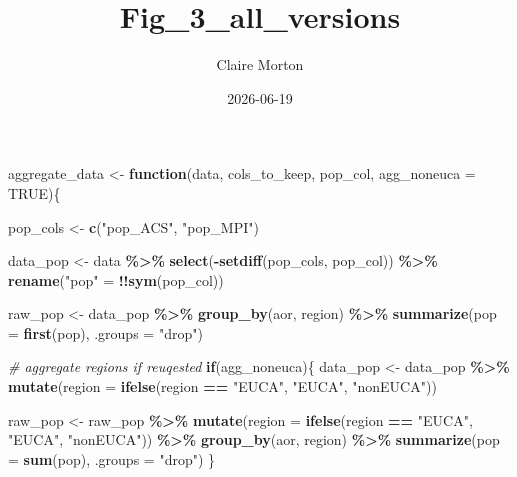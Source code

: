 \documentclass[
]{article}
\title{Fig\_3\_all\_versions}
\author{Claire Morton}
\date{2026-06-19}
\newenvironment{Shaded}{\begin{snugshade}}{\end{snugshade}}
\newcommand{\AttributeTok}[1]{\textcolor[rgb]{0.13,0.29,0.53}{#1}}
\newcommand{\CommentTok}[1]{\textcolor[rgb]{0.56,0.35,0.01}{\textit{#1}}}
\newcommand{\ConstantTok}[1]{\textcolor[rgb]{0.56,0.35,0.01}{#1}}
\newcommand{\ControlFlowTok}[1]{\textcolor[rgb]{0.13,0.29,0.53}{\textbf{#1}}}
\newcommand{\FunctionTok}[1]{\textcolor[rgb]{0.13,0.29,0.53}{\textbf{#1}}}
\newcommand{\NormalTok}[1]{#1}
\newcommand{\OtherTok}[1]{\textcolor[rgb]{0.56,0.35,0.01}{#1}}
\newcommand{\SpecialCharTok}[1]{\textcolor[rgb]{0.81,0.36,0.00}{\textbf{#1}}}
\newcommand{\StringTok}[1]{\textcolor[rgb]{0.31,0.60,0.02}{#1}}
\begin{document}
\maketitle

\begin{Shaded}
\begin{Highlighting}[]
\NormalTok{aggregate\_data }\OtherTok{\textless{}{-}} \ControlFlowTok{function}\NormalTok{(data, }
\NormalTok{                           cols\_to\_keep, }
\NormalTok{                           pop\_col,}
                           \AttributeTok{agg\_noneuca =} \ConstantTok{TRUE}\NormalTok{)\{}
  
  
\NormalTok{  pop\_cols }\OtherTok{\textless{}{-}} \FunctionTok{c}\NormalTok{(}\StringTok{"pop\_ACS"}\NormalTok{, }\StringTok{"pop\_MPI"}\NormalTok{)}
  
\NormalTok{  data\_pop }\OtherTok{\textless{}{-}}\NormalTok{ data }\SpecialCharTok{\%\textgreater{}\%} 
    \FunctionTok{select}\NormalTok{(}\SpecialCharTok{{-}}\FunctionTok{setdiff}\NormalTok{(pop\_cols, pop\_col)) }\SpecialCharTok{\%\textgreater{}\%}
    \FunctionTok{rename}\NormalTok{(}\StringTok{"pop"} \OtherTok{=} \SpecialCharTok{!!}\FunctionTok{sym}\NormalTok{(pop\_col))}
  
\NormalTok{  raw\_pop }\OtherTok{\textless{}{-}}\NormalTok{ data\_pop }\SpecialCharTok{\%\textgreater{}\%}
    \FunctionTok{group\_by}\NormalTok{(aor, region) }\SpecialCharTok{\%\textgreater{}\%}
    \FunctionTok{summarize}\NormalTok{(}\AttributeTok{pop =} \FunctionTok{first}\NormalTok{(pop), }\AttributeTok{.groups =} \StringTok{"drop"}\NormalTok{)}
  
  \CommentTok{\# aggregate regions if reuqested}
  \ControlFlowTok{if}\NormalTok{(agg\_noneuca)\{}
\NormalTok{    data\_pop }\OtherTok{\textless{}{-}}\NormalTok{ data\_pop }\SpecialCharTok{\%\textgreater{}\%} 
      \FunctionTok{mutate}\NormalTok{(}\AttributeTok{region =} \FunctionTok{ifelse}\NormalTok{(region }\SpecialCharTok{==} \StringTok{"EUCA"}\NormalTok{, }\StringTok{"EUCA"}\NormalTok{, }\StringTok{"nonEUCA"}\NormalTok{))}
    
\NormalTok{    raw\_pop }\OtherTok{\textless{}{-}}\NormalTok{ raw\_pop }\SpecialCharTok{\%\textgreater{}\%} 
      \FunctionTok{mutate}\NormalTok{(}\AttributeTok{region =} \FunctionTok{ifelse}\NormalTok{(region }\SpecialCharTok{==} \StringTok{"EUCA"}\NormalTok{, }\StringTok{"EUCA"}\NormalTok{, }\StringTok{"nonEUCA"}\NormalTok{)) }\SpecialCharTok{\%\textgreater{}\%}
      \FunctionTok{group\_by}\NormalTok{(aor, region) }\SpecialCharTok{\%\textgreater{}\%}
      \FunctionTok{summarize}\NormalTok{(}\AttributeTok{pop =} \FunctionTok{sum}\NormalTok{(pop), }\AttributeTok{.groups =} \StringTok{"drop"}\NormalTok{)}
\NormalTok{  \}}
  

\end{Highlighting}
\end{Shaded}
\end{document}
